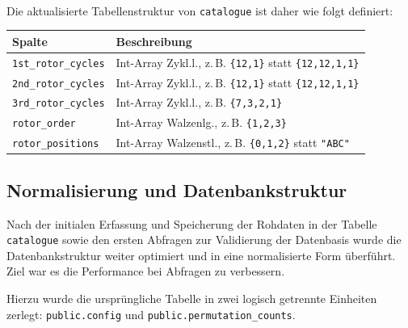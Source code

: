 \documentclass[12pt, ngerman, a4paper, numbers=noenddot]{article}
\begin{document}
\ \\
Die aktualisierte Tabellenstruktur von \lstinline|catalogue| ist daher wie folgt definiert:
\newline
\begin{center}
	\begin{tabular}{ll}
		\toprule
		\textbf{Spalte} & \textbf{Beschreibung} \\
		\midrule
		\lstinline|1st_rotor_cycles| & Int-Array Zykl.l., z.\,B. \lstinline|{12,1}| statt \lstinline|{12,12,1,1}| \\
		\lstinline|2nd_rotor_cycles| & Int-Array Zykl.l., z.\,B. \lstinline|{12,1}| statt \lstinline|{12,12,1,1}| \\
		\lstinline|3rd_rotor_cycles| & Int-Array Zykl.l., z.\,B. \lstinline|{7,3,2,1}| \\
		\lstinline|rotor_order|  & Int-Array Walzenlg., z.\,B. \lstinline|{1,2,3}| \\
		\lstinline|rotor_positions|      & Int-Array Walzenstl., z.\,B. \lstinline|{0,1,2}| statt \lstinline|"ABC"| \\
		\bottomrule
	\end{tabular}
\end{center}

\newpage
\subsection{Normalisierung und Datenbankstruktur}

Nach der initialen Erfassung und Speicherung der Rohdaten in der Tabelle \lstinline|catalogue| sowie den ersten Abfragen zur Validierung der Datenbasis wurde die Datenbankstruktur weiter optimiert und in eine normalisierte Form überführt. Ziel war es die Performance bei Abfragen zu verbessern.

Hierzu wurde die ursprüngliche Tabelle in zwei logisch getrennte Einheiten zerlegt: \lstinline|public.config| und \lstinline|public.permutation_counts|.
\end{document}
